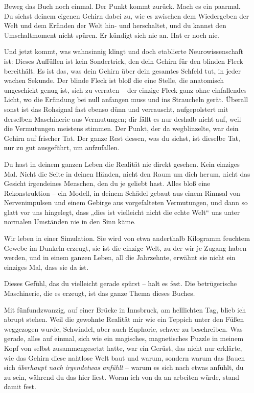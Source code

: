 \documentclass[11pt, twoside, openright]{book}
\begin{document}
Beweg das Buch noch einmal. Der Punkt kommt zurück. Mach es ein paarmal. Du siehst deinem eigenen Gehirn dabei zu, wie es zwischen dem Wiedergeben der Welt und dem Erfinden der Welt hin- und herschaltet, und du kannst den Umschaltmoment nicht spüren. Er kündigt sich nie an. Hat er noch nie.

Und jetzt kommt, was wahnsinnig klingt und doch etablierte Neurowissenschaft ist: Dieses Auffüllen ist kein Sondertrick, den dein Gehirn für den blinden Fleck bereithält. Es ist das, was dein Gehirn über dein gesamtes Sehfeld tut, in jeder wachen Sekunde. Der blinde Fleck ist bloß die eine Stelle, die anatomisch ungeschickt genug ist, sich zu verraten -- der einzige Fleck ganz ohne einfallendes Licht, wo die Erfindung bei null anfangen muss und ins Straucheln gerät. Überall sonst ist das Rohsignal fast ebenso dünn und verrauscht, aufgepolstert mit derselben Maschinerie aus Vermutungen; dir fällt es nur deshalb nicht auf, weil die Vermutungen meistens stimmen. Der Punkt, der da wegblinzelte, war dein Gehirn auf frischer Tat. Der ganze Rest dessen, was du siehst, ist dieselbe Tat, nur zu gut ausgeführt, um aufzufallen.

Du hast in deinem ganzen Leben die Realität nie direkt gesehen. Kein einziges Mal. Nicht die Seite in deinen Händen, nicht den Raum um dich herum, nicht das Gesicht irgendeines Menschen, den du je geliebt hast. Alles bloß eine Rekonstruktion -- ein Modell, in deinem Schädel gebaut aus einem Rinnsal von Nervenimpulsen und einem Gebirge aus vorgefalteten Vermutungen, und dann so glatt vor uns hingelegt, dass „dies ist vielleicht nicht die echte Welt“ uns unter normalen Umständen nie in den Sinn käme.

Wir leben in einer Simulation. Sie wird von etwa anderthalb Kilogramm feuchtem Gewebe im Dunkeln erzeugt, sie ist die einzige Welt, zu der wir je Zugang haben werden, und in einem ganzen Leben, all die Jahrzehnte, erwähnt sie nicht ein einziges Mal, dass sie da ist.

Dieses Gefühl, das du vielleicht gerade spürst -- halt es fest. Die betrügerische Maschinerie, die es erzeugt, ist das ganze Thema dieses Buches.

Mit fünfundzwanzig, auf einer Brücke in Innsbruck, am helllichten Tag, blieb ich abrupt stehen. Weil die gewohnte Realität mir wie ein Teppich unter den Füßen weggezogen wurde, Schwindel, aber auch Euphorie, schwer zu beschreiben. Was gerade, alles auf einmal, sich wie ein magisches, magnetisches Puzzle in meinem Kopf von selbst zusammengesetzt hatte, war ein Gerüst, das nicht nur erklärte, wie das Gehirn diese nahtlose Welt baut und warum, sondern warum das Bauen sich \textit{überhaupt nach irgendetwas anfühlt} -- warum es sich nach etwas anfühlt, du zu sein, während du das hier liest. Woran ich von da an arbeiten würde, stand damit fest.
\end{document}
